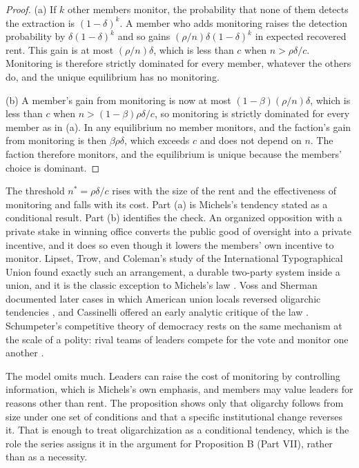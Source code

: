 \documentclass[11pt,letterpaper]{article}
\theoremstyle{definition}
\theoremstyle{remark}
\begin{document}
\begin{proof}
(a) If $k$ other members monitor, the probability that none of them detects the extraction is $(1-\delta)^k$. A member who adds monitoring raises the detection probability by $\delta(1-\delta)^k$ and so gains $(\rho/n)\delta(1-\delta)^k$ in expected recovered rent. This gain is at most $(\rho/n)\delta$, which is less than $c$ when $n>\rho\delta/c$. Monitoring is therefore strictly dominated for every member, whatever the others do, and the unique equilibrium has no monitoring.

(b) A member's gain from monitoring is now at most $(1-\beta)(\rho/n)\delta$, which is less than $c$ when $n>(1-\beta)\rho\delta/c$, so monitoring is strictly dominated for every member as in (a). In any equilibrium no member monitors, and the faction's gain from monitoring is then $\beta\rho\delta$, which exceeds $c$ and does not depend on $n$. The faction therefore monitors, and the equilibrium is unique because the members' choice is dominant.
\end{proof}

The threshold $n^\ast=\rho\delta/c$ rises with the size of the rent and the effectiveness of monitoring and falls with its cost. Part (a) is Michels's tendency stated as a conditional result. Part (b) identifies the check. An organized opposition with a private stake in winning office converts the public good of oversight into a private incentive, and it does so even though it lowers the members' own incentive to monitor. Lipset, Trow, and Coleman's study of the International Typographical Union found exactly such an arrangement, a durable two-party system inside a union, and it is the classic exception to Michels's law \citep{lipset1956}. Voss and Sherman documented later cases in which American union locals reversed oligarchic tendencies \citep{voss2000}, and Cassinelli offered an early analytic critique of the law \citep{cassinelli1953}. Schumpeter's competitive theory of democracy rests on the same mechanism at the scale of a polity: rival teams of leaders compete for the vote and monitor one another \citep{schumpeter1942}.

The model omits much. Leaders can raise the cost of monitoring by controlling information, which is Michels's own emphasis, and members may value leaders for reasons other than rent. The proposition shows only that oligarchy follows from size under one set of conditions and that a specific institutional change reverses it. That is enough to treat oligarchization as a conditional tendency, which is the role the series assigns it in the argument for Proposition B (Part VII), rather than as a necessity.
\end{document}
